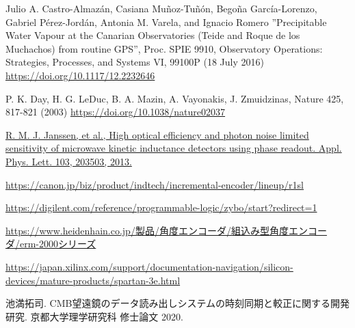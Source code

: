 \begin{thebibliography}{99}


Julio A. Castro-Almaz\'{a}n, Casiana Mu\~{n}oz-Tu\~{n}\'{o}n, Bego\~{n}a Garc\'{i}a-Lorenzo, Gabriel P\'{e}rez-Jord\'{a}n, Antonia M. Varela, and Ignacio Romero ”Precipitable Water Vapour at the Canarian Observatories (Teide and Roque de los Muchachos) from routine GPS”, Proc. SPIE 9910, Observatory Operations: Strategies, Processes, and Systems VI, 99100P (18 July 2016)
\href{https://doi.org/10.1117/12.2232646}{https://doi.org/10.1117/12.2232646}

P. K. Day, H. G. LeDuc, B. A. Mazin, A. Vayonakis, J. Zmuidzinas, Nature 425,
817-821 (2003)
\href{https://doi.org/10.1038/nature02037}{https://doi.org/10.1038/nature02037}

\href{R. M. J. Janssen, et al., High optical efficiency and photon noise limited sensitivity of microwave kinetic inductance detectors using phase readout. Appl. Phys. Lett. 103, 203503, 2013.}{R. M. J. Janssen, et al., High optical efficiency and photon noise limited sensitivity of microwave kinetic inductance detectors using phase readout. Appl. Phys. Lett. 103, 203503, 2013.}

\href{https://canon.jp/biz/product/indtech/incremental-encoder/lineup/r1sl}{https://canon.jp/biz/product/indtech/incremental-encoder/lineup/r1sl}

\href{https://digilent.com/reference/programmable-logic/zybo/start?redirect=1}{https://digilent.com/reference/programmable-logic/zybo/start?redirect=1}

\href{https://www.heidenhain.co.jp/製品/角度エンコーダ/組込み型角度エンコーダ/erm-2000シリーズ}{https://www.heidenhain.co.jp/製品/角度エンコーダ/組込み型角度エンコーダ/erm-2000シリーズ}

\href{https://japan.xilinx.com/support/documentation-navigation/silicon-devices/mature-products/spartan-3e.html}{
https://japan.xilinx.com/support/documentation-navigation/silicon-devices/mature-products/spartan-3e.html}

池満拓司. CMB望遠鏡のデータ読み出しシステムの時刻同期と較正に関する開発研究. 京都大学理学研究科 修士論文 2020.


\end{thebibliography}
